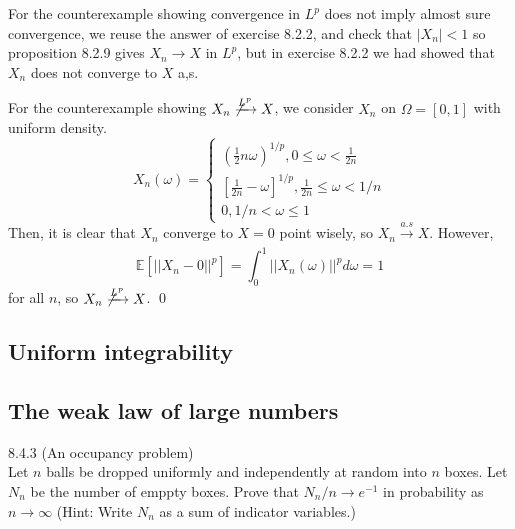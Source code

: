 \begin{answer}
For the counterexample showing convergence in $L^p$ does not imply almost sure convergence, we reuse the answer of exercise 8.2.2, and check that $|X_n| < 1$ so proposition 8.2.9 gives $X_n \to X$ in $L^p$, but in exercise 8.2.2 we had showed that $X_n$ does not converge to $X$ a,s.

For the counterexample showing  $X_n \not\xrightarrow[]{L^p} X$, we consider $X_n$ on $\Omega = [0,1]$ with uniform density.
\begin{equation}
    X_n(\omega) = \begin{cases}
        (\frac{1}{2}n \omega)^{1/p}, 0\leq \omega < \frac{1}{2n} \\
         [\frac{1}{2n}-\omega ]^{1/p},  \frac{1}{2n} \leq \omega < 1/n \\
        0, 1/n<\omega \leq 1
    \end{cases}
\end{equation} 
Then, it is clear that $X_n$ converge to $X = 0$ point wisely, so $X_n \xrightarrow[]{a.s} X$. However,
\begin{equation}
    \mathbb{E}[||X_n - 0||^p] = \int_0^1 ||X_n(\omega)||^p d\omega = 1
\end{equation}
for all $n$, so $X_n \not \xrightarrow[]{L^p} X$.
\qquad \qed
\end{answer}

\subsection{Uniform integrability}
\subsection{The weak law of large numbers}
\begin{exercise} 8.4.3 (An occupancy problem)\\
Let $n$ balls be dropped uniformly and independently at random into $n$ boxes. Let $N_n$ be the number of emppty boxes. Prove that $N_n/n \to e^{-1}$ in probability as $n \to \infty$ (Hint: Write $N_n$ as a sum of indicator variables.)
\end{exercise}

